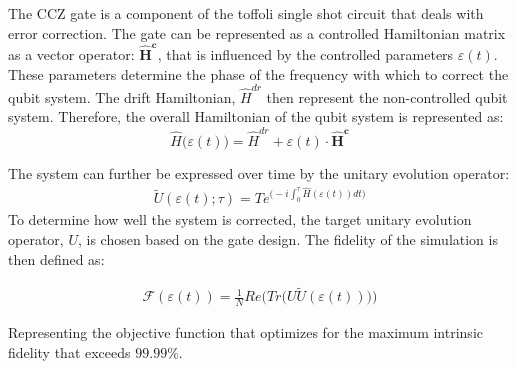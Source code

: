 The CCZ gate is a component of the toffoli single shot circuit that deals with error correction. The gate can be represented as a controlled Hamiltonian matrix as a vector operator: $\mathbf{\hat{H}^c}$, that is influenced by the controlled parameters $\varepsilon (t)$. These parameters determine the phase of the frequency with which to correct the qubit system. The drift Hamiltonian, $\hat{H}^{dr}$ then represent the non-controlled qubit system. Therefore, the overall Hamiltonian of the qubit system
is represented as: 
\begin{equation*}
\hat{H} \big( \varepsilon (t) \big) = \hat{H}^{dr} + \varepsilon (t) \cdot  \mathbf{\hat{H}^c}
\end{equation*}

The system can further be expressed over time by the unitary evolution operator:
\vspace{0.15cm}
\begin{align*}
  \tilde{U}(\varepsilon(t);\tau) = T e^{\Big( -i \int_{0}^{\tau} \hat{H}(\varepsilon(t))dt \Big) } 
\end{align*}
To determine how well the system is corrected, the target unitary evolution operator, $U$, is chosen based on the gate design. The fidelity of the simulation is then defined as:
\begin{center}
\begin{align*}
  \mathscr{F} (\varepsilon(t)) = \frac{1}{N} Re \Big(Tr \big(U\tilde{U}(\varepsilon(t))\big) \Big)
\end{align*}
\end{center}
Representing the objective function that optimizes for the maximum intrinsic fidelity that exceeds $99.99\%$. 


